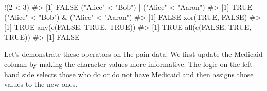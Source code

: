 \documentclass[
  letterpaper,
]{latex/krantz}
\makeatletter
\newenvironment{Shaded}{\begin{snugshade}}{\end{snugshade}}
\newcommand{\CommentTok}[1]{\textcolor[rgb]{0.37,0.37,0.37}{#1}}
\newcommand{\ConstantTok}[1]{\textcolor[rgb]{0.56,0.35,0.01}{#1}}
\newcommand{\DecValTok}[1]{\textcolor[rgb]{0.68,0.00,0.00}{#1}}
\newcommand{\FunctionTok}[1]{\textcolor[rgb]{0.28,0.35,0.67}{#1}}
\newcommand{\NormalTok}[1]{\textcolor[rgb]{0.00,0.23,0.31}{#1}}
\newcommand{\OtherTok}[1]{\textcolor[rgb]{0.00,0.23,0.31}{#1}}
\newcommand{\SpecialCharTok}[1]{\textcolor[rgb]{0.37,0.37,0.37}{#1}}
\newcommand{\StringTok}[1]{\textcolor[rgb]{0.13,0.47,0.30}{#1}}
\newenvironment{kframe}{%
\medskip{}
\setlength{\fboxsep}{.8em}
 \def\at@end@of@kframe{}%
 \ifinner\ifhmode%
  \def\at@end@of@kframe{\end{minipage}}%
  \begin{minipage}{\columnwidth}%
 \fi\fi%
 \def\FrameCommand##1{\hskip\@totalleftmargin \hskip-\fboxsep
 \colorbox{shadecolor}{##1}\hskip-\fboxsep
     \hskip-\linewidth \hskip-\@totalleftmargin \hskip\columnwidth}%
 \MakeFramed {\advance\hsize-\width
   \@totalleftmargin\z@ \linewidth\hsize
   \@setminipage}}%
 {\par\unskip\endMakeFramed%
 \at@end@of@kframe}
\renewenvironment{Shaded}{\begin{kframe}}{\end{kframe}}
\makeatother
\begin{document}
\begin{Shaded}
\begin{Highlighting}[]
\SpecialCharTok{!}\NormalTok{(}\DecValTok{2} \SpecialCharTok{\textless{}} \DecValTok{3}\NormalTok{)}
\CommentTok{\#\textgreater{} [1] FALSE}
\NormalTok{(}\StringTok{"Alice"} \SpecialCharTok{\textless{}} \StringTok{"Bob"}\NormalTok{) }\SpecialCharTok{|}\NormalTok{ (}\StringTok{"Alice"} \SpecialCharTok{\textless{}} \StringTok{"Aaron"}\NormalTok{)}
\CommentTok{\#\textgreater{} [1] TRUE}
\NormalTok{(}\StringTok{"Alice"} \SpecialCharTok{\textless{}} \StringTok{"Bob"}\NormalTok{) }\SpecialCharTok{\&}\NormalTok{ (}\StringTok{"Alice"} \SpecialCharTok{\textless{}} \StringTok{"Aaron"}\NormalTok{)}
\CommentTok{\#\textgreater{} [1] FALSE}
\FunctionTok{xor}\NormalTok{(}\ConstantTok{TRUE}\NormalTok{, }\ConstantTok{FALSE}\NormalTok{)}
\CommentTok{\#\textgreater{} [1] TRUE}
\FunctionTok{any}\NormalTok{(}\FunctionTok{c}\NormalTok{(}\ConstantTok{FALSE}\NormalTok{, }\ConstantTok{TRUE}\NormalTok{, }\ConstantTok{TRUE}\NormalTok{))}
\CommentTok{\#\textgreater{} [1] TRUE}
\FunctionTok{all}\NormalTok{(}\FunctionTok{c}\NormalTok{(}\ConstantTok{FALSE}\NormalTok{, }\ConstantTok{TRUE}\NormalTok{, }\ConstantTok{TRUE}\NormalTok{))}
\CommentTok{\#\textgreater{} [1] FALSE}
\end{Highlighting}
\end{Shaded}

Let's demonstrate these operators on the pain data. We first update the
Medicaid column by making the character values more informative. The
logic on the left-hand side selects those who do or do not have Medicaid
and then assigns those values to the new ones.

\begin{Shaded}
\end{Shaded}
\end{document}
